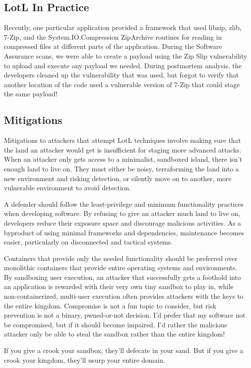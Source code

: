\subsection{LotL In Practice}

Recently, one particular application provided a framework that used libzip, zlib, 7-Zip, and the System.IO.Compression ZipArchive routines for reading in compressed files at different parts of the application. During the Software Assurance scans, we were able to create a payload using the Zip Slip vulnerability to upload and execute any payload we needed. During postmortem analysis, the developers cleaned up the vulnerability that was used, but forgot to verify that another location of the code used a vulnerable version of 7-Zip that could stage the same payload!

\subsection{Mitigations}

Mitigations to attackers that attempt LotL techniques involve making sure that the land an attacker would get is insufficient for staging more advanced attacks. When an attacker only gets access to a minimalist, sandboxed island, there isn't enough land to live on. They must either be noisy, terraforming the land into a new environment and risking detection, or silently move on to another, more vulnerable environment to avoid detection.

A defender should follow the least-privilege and minimum functionality practices when developing software. By refusing to give an attacker much land to live on, developers reduce their exposure space and discourage malicious activities. As a byproduct of using minimal frameworks and dependencies, maintenance becomes easier, particularly on disconnected and tactical systems.

Containers that provide only the needed functionality should be preferred over monolithic containers that provide entire operating systems and environments. By sandboxing user execution, an attacker that successfully gets a foothold into an application is rewarded with their very own tiny sandbox to play in, while non-containerized, multi-user execution often provides attackers with the keys to the entire kingdom. Compromise is not a fun topic to consider, but risk prevention is not a binary, pwned-or-not decision. I'd prefer that my software not be compromised, but if it should become impaired, I'd rather the malicious attacker only be able to steal the sandbox rather than the entire kingdom!

If you give a crook your sandbox, they'll defecate in your sand. But if you give a crook your kingdom, they'll usurp your entire domain.
